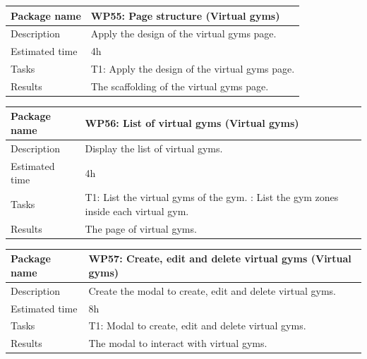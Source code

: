 \documentclass[a4paper, 12pt, oneside]{book}
\begin{document}
\begin{tabularx}{\textwidth}{| l | X |}
	\hline
	\rowcolor{rowColor}
	{\semibf Package name}   & {\semibf WP55}: Page structure (Virtual gyms)            \\
	\hline
	{\semibf Description}    & Apply the design of the virtual gyms page.               \\
	\hline
	\rowcolor{rowColor}
	{\semibf Estimated time} & 4h                                                       \\
	\hline
	{\semibf Tasks}          & {\semibf T1}: Apply the design of the virtual gyms page. \\
	\hline
	\rowcolor{rowColor}
	{\semibf Results}        & The scaffolding of the virtual gyms page.                \\
	\hline
\end{tabularx}
\vspace*{16pt}
\begin{tabularx}{\textwidth}{| l | X |}
	\hline
	\rowcolor{rowColor}
	{\semibf Package name}   & {\semibf WP56}: List of virtual gyms (Virtual gyms) \\
	\hline
	{\semibf Description}    & Display the list of virtual gyms.                   \\
	\hline
	\rowcolor{rowColor}
	{\semibf Estimated time} & 4h                                                  \\
	\hline
	{\semibf Tasks}          & {\semibf T1}: List the virtual gyms of the gym.
	\newline {\semibf T2}: List the gym zones inside each virtual gym.             \\
	\hline
	\rowcolor{rowColor}
	{\semibf Results}        & The page of virtual gyms.                           \\
	\hline
\end{tabularx}
\vspace*{16pt}
\begin{tabularx}{\textwidth}{| l | X |}
	\hline
	\rowcolor{rowColor}
	{\semibf Package name}   & {\semibf WP57}: Create, edit and delete virtual gyms (Virtual gyms) \\
	\hline
	{\semibf Description}    & Create the modal to create, edit and delete virtual gyms.           \\
	\hline
	\rowcolor{rowColor}
	{\semibf Estimated time} & 8h                                                                  \\
	\hline
	{\semibf Tasks}          & {\semibf T1}: Modal to create, edit and delete virtual gyms.        \\
	\hline
	\rowcolor{rowColor}
	{\semibf Results}        & The modal to interact with virtual gyms.                            \\
	\hline
\end{tabularx}
\end{document}
